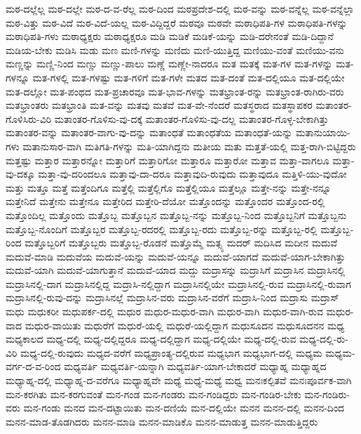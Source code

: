 {ಮಠ-ದಲ್ಲೆಲ್ಲ
ಮಠ-ದಲ್ಲೇ
ಮಠ-ದ-ವ-ರೆಲ್ಲ
ಮಠ-ದಿಂದ
ಮಠಪ್ರದೇಶ-ದಲ್ಲಿ
ಮಠ-ವನ್ನು
ಮಠ-ವನ್ನೆಲ್ಲ
ಮಠ-ವನ್ನೆಲ್ಲಾ
ಮಠ-ವಿತ್ತು
ಮಠ-ವಿದೆ
ಮಠ-ವಿದೆ-ಯಲ್ಲ
ಮಠ-ವಿದ್ದಿದ್ದರೆ
ಮಠವೂ
ಮಠವೇ
ಮಠಾಧಿಪತಿ-ಗಳ
ಮಠಾಧಿಪತಿ-ಗಳನ್ನು
ಮಠಾಧಿಪತಿ-ಗಳು
ಮಠಾಧ್ಯಕ್ಷರು
ಮಠಾಧ್ಯಕ್ಷರೂ
ಮಡಿ
ಮಡಿಕೆ
ಮಡಿಕೆ-ಯನ್ನು
ಮಡಿ-ದರೇನಂತೆ
ಮಡಿ-ದಿದ್ದಾನೆ
ಮಡಿಯ-ಬೇಕು
ಮಡಿಸಿ
ಮಡು
ಮಣ
ಮಣಿ-ಗಳನ್ನು
ಮಣಿದು
ಮಣಿ-ಯುತ್ತಿದ್ದ
ಮಣಿಯು-ವಂತೆ
ಮಣಿಯು-ವನು
ಮಣ್ಣನ್ನು
ಮಣ್ಣಿ-ನಿಂದ
ಮಣ್ಣು
ಮಣ್ಣು-ಪಾಲು
ಮಣ್ಣೆ
ಮಣ್ಣೇ-ನಾದರೂ
ಮತ
ಮತಕ್ಕೆ
ಮತ-ಗಳ
ಮತ-ಗಳನ್ನು
ಮತ-ಗಳನ್ನೂ
ಮತ-ಗಳಲ್ಲಿ
ಮತ-ಗಳಷ್ಟು
ಮತ-ಗಳಿಗೆ
ಮತ-ಗಳೇ
ಮತದ
ಮತ-ದಂತೆ
ಮತ-ದಲ್ಲಿಯೂ
ಮತ-ದಲ್ಲಿಯೇ
ಮತ-ದಲ್ಲೋ
ಮತ-ಪಂಥದ
ಮತ-ಪ್ರಚಾರವೂ
ಮತ-ಭಾವ-ಗಳನ್ನು
ಮತಭ್ರಾಂತ-ರನ್ನು
ಮತಭ್ರಾಂತ-ರಾಗಿರು-ವರು
ಮತಭ್ರಾಂತರು
ಮತಭ್ರಾಂತಿ
ಮತ-ವನ್ನು
ಮತವು
ಮತವೆ
ಮತ-ವೇ-ನೆಂದರೆ
ಮತಸ್ಥರಾದ
ಮತಸ್ಥಾಪಕರ
ಮತಾಂತರ-ಗೊಳಿಸಿರು-ವಿರಿ
ಮತಾಂತರ-ಗೊಳಿಸು-ವು-ದಕ್ಕೆ
ಮತಾಂತರ-ಗೊಳಿಸು-ವು-ದಲ್ಲ
ಮತಾಂತರ-ಗೊಳ್ಳ-ಬೇಕಾಗಿತ್ತು
ಮತಾಂತರ-ವನ್ನು
ಮತಾಂತರ-ವಾಗು-ವು-ದನ್ನು
ಮತಾಂಧತೆ
ಮತಾಂಧತೆಯ
ಮತಾಂಧತೆ-ಯನ್ನು
ಮತಾನುಯಾಯಿ-ಗಳು
ಮತಾನುಸಾರ-ವಾಗಿ
ಮತಿಗತಿ-ಗಳನ್ನು
ಮತಿ-ಯಾಗಿದ್ದನು
ಮತೀಯ
ಮತು
ಮತ್ತತೆ-ಯಲ್ಲಿ
ಮತ್ತ-ರಾಗಿ-ಬಿಟ್ಟಿದ್ದರು
ಮತ್ತಷ್ಟು
ಮತ್ತಾರ
ಮತ್ತಾರನ್ನೋ
ಮತ್ತಾರಿಗೆ
ಮತ್ತಾರಿಗೋ
ಮತ್ತಾರೂ
ಮತ್ತಾರೋ
ಮತ್ತಾವ
ಮತ್ತಾ-ವಾಗಲೂ
ಮತ್ತಾ-ವು-ದಕ್ಕೂ
ಮತ್ತಾ-ವು-ದರಿಂದಲೂ
ಮತ್ತಾವು-ದಾ-ದರೂ
ಮತ್ತಾವುದಿ-ರುವುದು
ಮತ್ತಾವುದೂ
ಮತ್ತಿಳಿ-ಯು-ವುದೋ
ಮತ್ತು
ಮತ್ತೂ
ಮತ್ತೆ
ಮತ್ತೆಂದಿಗೂ
ಮತ್ತೆಲ್ಲಿ
ಮತ್ತೆಲ್ಲಿಗೊ
ಮತ್ತೆಲ್ಲಿಯೂ
ಮತ್ತೆಲ್ಲೂ
ಮತ್ತೇ-ನನ್ನು
ಮತ್ತೇ-ನನ್ನೂ
ಮತ್ತೇನಿದೆ
ಮತ್ತೇನು
ಮತ್ತೇನೂ
ಮತ್ತೇರಿದ
ಮತ್ತೇರಿ-ದೆಯೋ
ಮತ್ತೊಂದನ್ನು
ಮತ್ತೊಂದರ
ಮತ್ತೊಂದ-ರಲ್ಲಿ
ಮತ್ತೊಂದಿಲ್ಲ
ಮತ್ತೊಂದು
ಮತ್ತೊಬ್ಬ
ಮತ್ತೊಬ್ಬನ
ಮತ್ತೊಬ್ಬ-ನನ್ನು
ಮತ್ತೊಬ್ಬ-ನಿಂದ
ಮತ್ತೊಬ್ಬನಿಗೆ
ಮತ್ತೊಬ್ಬನು
ಮತ್ತೊಬ್ಬ-ನೊಂದಿಗೆ
ಮತ್ತೊಬ್ಬರ
ಮತ್ತೊಬ್ಬ-ರದರಲ್ಲಿ
ಮತ್ತೊಬ್ಬ-ರದು
ಮತ್ತೊಬ್ಬ-ರನ್ನು
ಮತ್ತೊಬ್ಬ-ರಲ್ಲಿ
ಮತ್ತೊಬ್ಬ-ರಿಂದ
ಮತ್ತೊಬ್ಬರಿಗೆ
ಮತ್ತೊಬ್ಬರು
ಮತ್ತೊಬ್ಬ-ರೊಡನೆ
ಮತ್ತೊಮ್ಮೆ
ಮತ್ಸ್ಯ
ಮದರ್
ಮದಿಸಿದ
ಮದೀನ
ಮದುವೆ
ಮದುವೆ-ಮಾಡಿ
ಮದುವೆಯ
ಮದುವೆ-ಯನ್ನು
ಮದುವೆ-ಯನ್ನೂ
ಮದುವೆ-ಯಾಗದೆ
ಮದುವೆ-ಯಾಗ-ಬೇಕಾಗಿತ್ತು
ಮದುವೆ-ಯಾಗಿ
ಮದುವೆ-ಯಾಗುತ್ತಾನೆ
ಮದುವೆ-ಯಾದ
ಮದ್ದು
ಮದ್ರಾಸನ್ನು
ಮದ್ರಾಸಿಗೆ
ಮದ್ರಾಸಿನ
ಮದ್ರಾಸಿನಲ್ಲಿ
ಮದ್ರಾಸಿನಲ್ಲಿ-ದಾಗ
ಮದ್ರಾಸಿನಲ್ಲಿದ್ದ
ಮದ್ರಾಸಿ-ನಲ್ಲಿದ್ದಾಗ
ಮದ್ರಾಸಿನಲ್ಲಿಯೇ
ಮದ್ರಾಸಿನಲ್ಲಿ-ರುವ
ಮದ್ರಾಸಿನಲ್ಲಿ-ರುವಾಗ
ಮದ್ರಾಸಿನಲ್ಲಿ-ರುವು-ದನ್ನು
ಮದ್ರಾಸಿನಲ್ಲೆ
ಮದ್ರಾಸಿನ-ವರು
ಮದ್ರಾಸಿನ-ವರೆಗೆ
ಮದ್ರಾಸಿ-ನಿಂದ
ಮದ್ರಾಸು
ಮದ್ರಾಸ್
ಮಧು
ಮಧುಕರೀ
ಮಧುಪರ್ಕ-ದಲ್ಲಿ
ಮಧುರ
ಮಧುರ-ಮಧುರ-ವಾಗಿ
ಮಧುರ-ವಾಗಿ
ಮಧುರ-ವಾಗಿ-ರುವ
ಮಧುರ-ವಾದ
ಮಧುರ-ವಾಯಿತು
ಮಧುರೆಗೆ
ಮಧುರೆ-ಯಲ್ಲಿ
ಮಧುರೆ-ಯಲ್ಲಿದ್ದಾಗ
ಮಧುಸೂದನ
ಮಧುಸೂದನನ
ಮಧ್ಯ
ಮಧ್ಯಕಾಲದ
ಮಧ್ಯ-ದಲ್ಲಿ
ಮಧ್ಯ-ದಲ್ಲಿದ್ದರೂ
ಮಧ್ಯ-ದಲ್ಲಿದ್ದಾಗ
ಮಧ್ಯ-ದಲ್ಲಿಯೇ
ಮಧ್ಯ-ದಲ್ಲಿ-ರುವ
ಮಧ್ಯ-ದಲ್ಲಿ-ರು-ವಿರಿ
ಮಧ್ಯ-ದಲ್ಲಿ-ರುವುದು
ಮಧ್ಯದ-ವರೆಗೆ
ಮಧ್ಯಪ್ರಾಂತ್ಯ-ದಲ್ಲಿರುವ
ಮಧ್ಯಭಾಗ
ಮಧ್ಯಭಾಗ-ದಲ್ಲಿ
ಮಧ್ಯಮ
ಮಧ್ಯಮ-ವರ್ಗ-ದ-ವ-ರಿಂದ
ಮಧ್ಯವರ್ತಿ
ಮಧ್ಯವರ್ತಿ-ಯನ್ನಾಗಿ
ಮಧ್ಯವರ್ತಿ-ಯಾಗ-ಬೇಕಾದರೆ
ಮಧ್ಯಾಹ್ನ
ಮಧ್ಯಾಹ್ನದ
ಮಧ್ಯಾಹ್ನ-ದಲ್ಲಿ
ಮಧ್ಯಾಹ್ನ-ದ-ವರೆಗೂ
ಮಧ್ಯಾಹ್ನವೇ
ಮಧ್ಯೆ
ಮಧ್ಯೆ-ಮಧ್ಯೆ
ಮಧ್ವ
ಮನಃಕಲ್ಪಿತವೆ
ಮನಃಪೂರ್ವಕ-ವಾಗಿ
ಮನ-ಕರಗಿತು
ಮನ-ಕರಗುವಂತೆ
ಮನ-ಗಂಡ
ಮನ-ಗಂಡರು
ಮನ-ಗಂಡಿದ್ದರು
ಮನ-ಗಂಡಿರ-ಬೇಕು
ಮನ-ಗಂಡಿರು-ವರು
ಮನ-ಗಂಡು
ಮನದ
ಮನ-ದಟ್ಟಾಯಿತು
ಮನ-ದಣಿಯೆ
ಮನ-ದಲ್ಲಿಯೇ
ಮನನ
ಮನನ-ದಲ್ಲಿ
ಮನನ-ದಿಂದ
ಮನನ-ಮಾಡ-ತೊಡಗಿದರು
ಮನನ-ಮಾಡಿ
ಮನನ-ಮಾಡಿಕೊ
ಮನನ-ಮಾಡುತ್ತ
ಮನನ-ಮಾಡುತ್ತಿದ್ದರು
}
